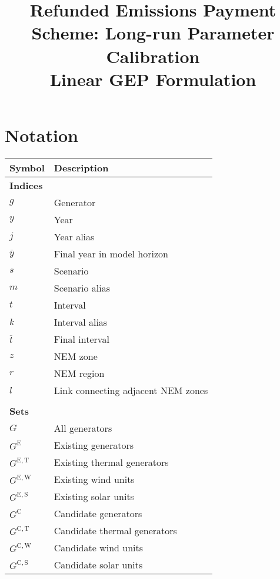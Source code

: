 \documentclass{article}
\title{Refunded Emissions Payment Scheme: Long-run Parameter Calibration\\Linear GEP Formulation}
\newcommand{\sGenerators}{G}
\newcommand{\sGeneratorsExisting}{G^{\mathrm{E}}}
\newcommand{\sGeneratorsExistingThermal}{G^{\mathrm{E,T}}}
\newcommand{\sGeneratorsExistingWind}{G^{\mathrm{E,W}}}
\newcommand{\sGeneratorsExistingSolar}{G^{\mathrm{E,S}}}
\newcommand{\sGeneratorsCandidate}{G^{\mathrm{C}}}
\newcommand{\sGeneratorsCandidateThermal}{G^{\mathrm{C,T}}}
\newcommand{\sGeneratorsCandidateWind}{G^{\mathrm{C,W}}}
\newcommand{\sGeneratorsCandidateSolar}{G^{\mathrm{C,S}}}
\newcommand{\iGenerator}{g}
\newcommand{\iYear}{y}
\newcommand{\iYearTerminal}{\overline{\iYear}}
\newcommand{\iYearAlias}{j}
\newcommand{\iScenario}{s}
\newcommand{\iScenarioAlias}{m}
\newcommand{\iInterval}{t}
\newcommand{\iIntervalAlias}{k}
\newcommand{\iIntervalTerminal}{\overline{\iInterval}}
\newcommand{\iZone}{z}
\newcommand{\iRegion}{r}
\newcommand{\iLink}{l}
\begin{document}
	\maketitle
	
	\section{Notation}
	\renewcommand*{\arraystretch}{1.3}
	\begin{longtable}{ p{}  p{}}
		\textbf{Symbol} & \textbf{Description}\\
		\hline\hline
		\multicolumn{2}{l}{\textbf{Indices}}\\
		$\iGenerator$ & Generator\\ 
		$\iYear$ & Year\\
		$\iYearAlias$ & Year alias\\
		$\iYearTerminal$ & Final year in model horizon\\
		$\iScenario$ & Scenario\\
		$\iScenarioAlias$ & Scenario alias\\
		$\iInterval$ & Interval\\
		$\iIntervalAlias$ & Interval alias\\
		$\iIntervalTerminal$ & Final interval\\
		$\iZone$ & NEM zone\\
		$\iRegion$ & NEM region\\
		$\iLink$ & Link connecting adjacent NEM zones\\
		& \\
		\multicolumn{2}{l}{\textbf{Sets}}\\
		$\sGenerators$ & All generators\\
		$\sGeneratorsExisting$ & Existing generators\\
		$\sGeneratorsExistingThermal$ & Existing thermal generators\\
		$\sGeneratorsExistingWind$ & Existing wind units\\
		$\sGeneratorsExistingSolar$ & Existing solar units\\
		$\sGeneratorsCandidate$ & Candidate generators\\
		$\sGeneratorsCandidateThermal$ & Candidate thermal generators\\
		$\sGeneratorsCandidateWind$ & Candidate wind units\\
		$\sGeneratorsCandidateSolar$ & Candidate solar units\\

\end{longtable}
\end{document}
